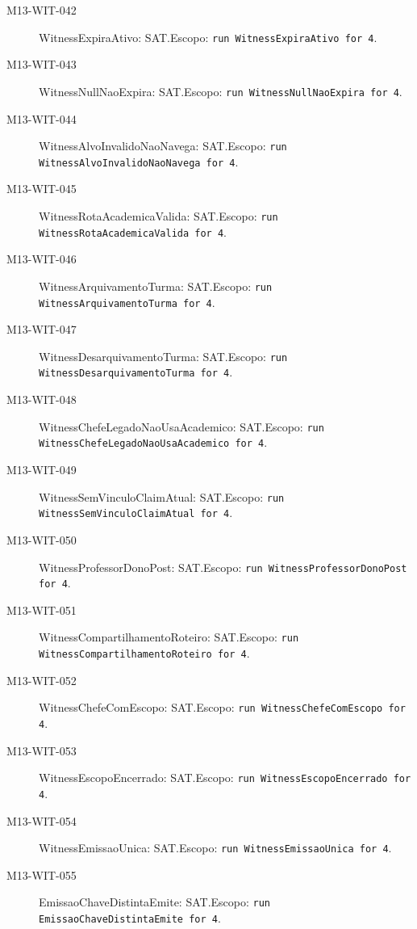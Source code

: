 \begin{description}
\item[M13-WIT-042] WitnessExpiraAtivo: SAT.\newline Escopo: \texttt{run WitnessExpiraAtivo for 4}.
\item[M13-WIT-043] WitnessNullNaoExpira: SAT.\newline Escopo: \texttt{run WitnessNullNaoExpira for 4}.
\item[M13-WIT-044] WitnessAlvoInvalidoNaoNavega: SAT.\newline Escopo: \texttt{run WitnessAlvoInvalidoNaoNavega for 4}.
\item[M13-WIT-045] WitnessRotaAcademicaValida: SAT.\newline Escopo: \texttt{run WitnessRotaAcademicaValida for 4}.
\item[M13-WIT-046] WitnessArquivamentoTurma: SAT.\newline Escopo: \texttt{run WitnessArquivamentoTurma for 4}.
\item[M13-WIT-047] WitnessDesarquivamentoTurma: SAT.\newline Escopo: \texttt{run WitnessDesarquivamentoTurma for 4}.
\item[M13-WIT-048] WitnessChefeLegadoNaoUsaAcademico: SAT.\newline Escopo: \texttt{run WitnessChefeLegadoNaoUsaAcademico for 4}.
\item[M13-WIT-049] WitnessSemVinculoClaimAtual: SAT.\newline Escopo: \texttt{run WitnessSemVinculoClaimAtual for 4}.
\item[M13-WIT-050] WitnessProfessorDonoPost: SAT.\newline Escopo: \texttt{run WitnessProfessorDonoPost for 4}.
\item[M13-WIT-051] WitnessCompartilhamentoRoteiro: SAT.\newline Escopo: \texttt{run WitnessCompartilhamentoRoteiro for 4}.
\item[M13-WIT-052] WitnessChefeComEscopo: SAT.\newline Escopo: \texttt{run WitnessChefeComEscopo for 4}.
\item[M13-WIT-053] WitnessEscopoEncerrado: SAT.\newline Escopo: \texttt{run WitnessEscopoEncerrado for 4}.
\item[M13-WIT-054] WitnessEmissaoUnica: SAT.\newline Escopo: \texttt{run WitnessEmissaoUnica for 4}.
\item[M13-WIT-055] EmissaoChaveDistintaEmite: SAT.\newline Escopo: \texttt{run EmissaoChaveDistintaEmite for 4}.

\end{description}

